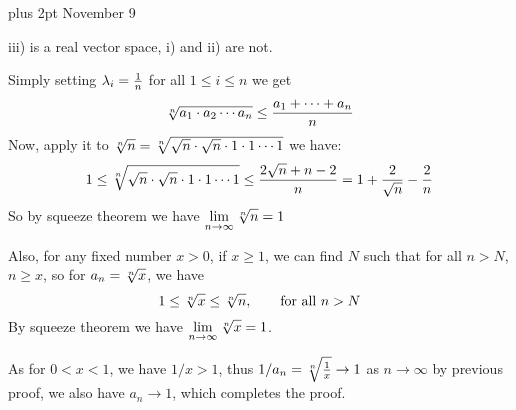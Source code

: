 
\mydoc
\baselineskip 16pt plus 2pt
 November {9}
%

\noindent iii) is a real vector space, i) and ii) are not.
\bigskip

\noindent Simply setting $\lambda_i={1\over n}$ for all $1\le i\le n$ we get
$${\root n \of {a_1\cdot a_2\cdots a_n}}\le{a_1+\cdots+a_n\over n}
$$
Now, apply it to ${\root n \of n}=
{\root n\of {\sqrt n \cdot \sqrt n \cdot 1 \cdot 1\cdots 1}}$ we have:
$$
1\le{\root n\of {\sqrt n \cdot \sqrt n \cdot 1 \cdot 1\cdots 1}}\le{2\sqrt n+n-2\over n}=1
+{2\over\sqrt n}-{2\over n}
$$
So by squeeze theorem we have $\displaystyle\lim_{n\to\infty}{\root n \of n}=1$

\noindent Also, for any fixed number $x>0$, if $x\ge1$, we can find $N$ such that for all $n>N$, $n\ge x$, so for $a_n={\root n \of x}$, we have 
$$
1\le {\root n \of x}\le {\root n \of n},\qquad \hbox{\rm for all }n>N
$$
By squeeze theorem we have $\displaystyle\lim_{n\to\infty}{\root n \of x}=1$. 

\noindent As for $0<x<1$, we have $1/x>1$, thus $1/a_n={\root n\of{1\over x}}\to 1$ as $n\to\infty$ by previous proof, we also have $a_n\to 1$, which completes the proof.
\bigskip

